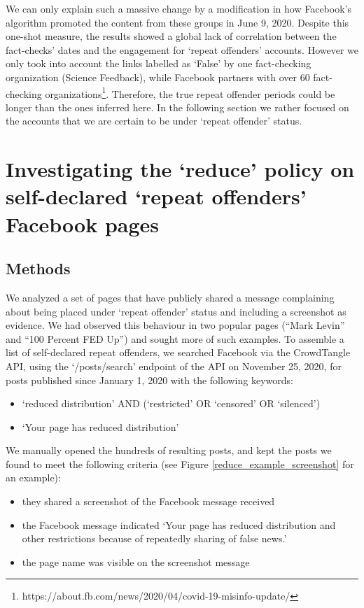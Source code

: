 \documentclass[11pt,a4paper]{article}
\begin{document}
We can only explain such a massive change by a modification in how Facebook’s algorithm promoted the content from these groups in June 9, 2020.
Despite this one-shot measure, the results showed a global lack of correlation between the fact-checks' dates and the engagement for `repeat offenders' accounts.
However we only took into account the links labelled as `False' by one fact-checking organization (Science Feedback), while Facebook partners with over 60 fact-checking organizations\footnote{https://about.fb.com/news/2020/04/covid-19-misinfo-update/}.
Therefore, the true repeat offender periods could be longer than the ones inferred here.
In the following section we rather focused on the accounts that we are certain to be under `repeat offender' status. 

\section{Investigating the `reduce’ policy on self-declared ‘repeat offenders’ Facebook pages}

\subsection{Methods}

We analyzed a set of pages that have publicly shared a message complaining about being placed under ‘repeat offender’ status and including a screenshot as evidence. 
We had observed this behaviour in two popular pages (“Mark Levin” and “100 Percent FED Up”) and sought more of such examples. 
To assemble a list of self-declared repeat offenders, we searched Facebook via the CrowdTangle API, using the `/posts/search' endpoint of the API on November 25, 2020, for posts published since January 1, 2020 with the following keywords:
\begin{itemize}
\item `reduced distribution' AND (`restricted' OR `censored' OR `silenced')
\item `Your page has reduced distribution'
\end{itemize}

We manually opened the hundreds of resulting posts, and kept the posts we found to meet the following criteria (see Figure \ref{reduce_example_screenshot} for an example):
\begin{itemize}
\item they shared a screenshot of the Facebook message received
\item the Facebook message indicated `Your page has reduced distribution and other restrictions because of repeatedly sharing of false news.'
\item the page name was visible on the screenshot message
\end{itemize}
\end{document}
